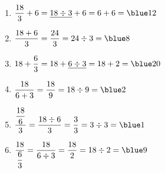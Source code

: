    \ \\ [-5mm]
   \begin{enumerate}
      \item $\dfrac{18}{3}+6 =\underline{18\div3}+6 =6+6 =\blue 12$ \medskip
      \item $\dfrac{18+6}{3} =\dfrac{24}{3} =24\div3 =\blue 8$ \medskip
      \item $18+\dfrac{6}{3} =18+\underline{6\div3} =18+2 =\blue 20$ \medskip
      \item $\dfrac{18}{6+3} =\dfrac{18}{9} =18\div9 =\blue 2$ \medskip
      \item $\dfrac{\dfrac{18}{6}}{3} =\dfrac{18\div6}{3} =\dfrac{3}{3} =3\div3 =\blue 1$ \medskip
      \item $\dfrac{18}{\dfrac{6}{3}} =\dfrac{18}{6\div3} =\dfrac{18}{2} =18\div2 =\blue 9$
   \end{enumerate}
